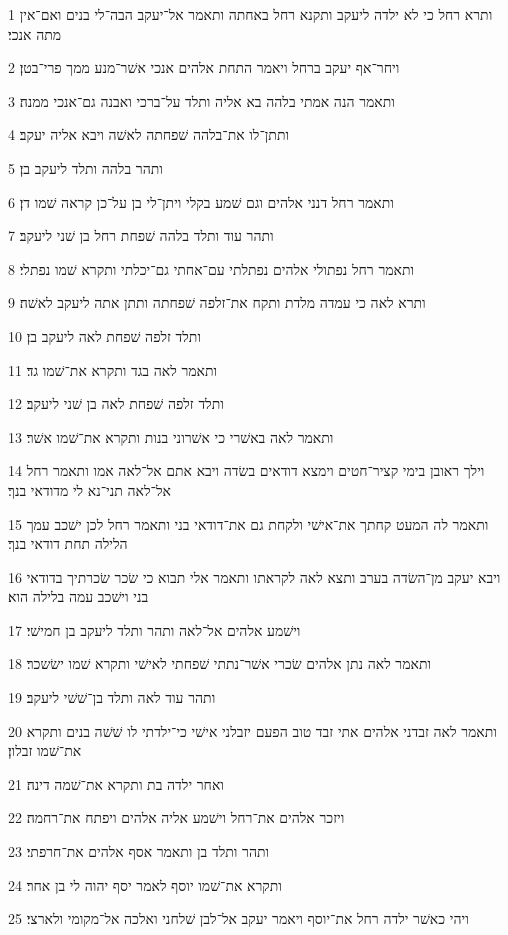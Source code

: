 \par 1 ותרא רחל כי לא ילדה ליעקב ותקנא רחל באחתה ותאמר אל־יעקב הבה־לי בנים ואם־אין מתה אנכי׃
\par 2 ויחר־אף יעקב ברחל ויאמר התחת אלהים אנכי אשׁר־מנע ממך פרי־בטן׃
\par 3 ותאמר הנה אמתי בלהה בא אליה ותלד על־ברכי ואבנה גם־אנכי ממנה׃
\par 4 ותתן־לו את־בלהה שׁפחתה לאשׁה ויבא אליה יעקב׃
\par 5 ותהר בלהה ותלד ליעקב בן׃
\par 6 ותאמר רחל דנני אלהים וגם שׁמע בקלי ויתן־לי בן על־כן קראה שׁמו דן׃
\par 7 ותהר עוד ותלד בלהה שׁפחת רחל בן שׁני ליעקב׃
\par 8 ותאמר רחל נפתולי אלהים נפתלתי עם־אחתי גם־יכלתי ותקרא שׁמו נפתלי׃
\par 9 ותרא לאה כי עמדה מלדת ותקח את־זלפה שׁפחתה ותתן אתה ליעקב לאשׁה׃
\par 10 ותלד זלפה שׁפחת לאה ליעקב בן׃
\par 11 ותאמר לאה בגד ותקרא את־שׁמו גד׃
\par 12 ותלד זלפה שׁפחת לאה בן שׁני ליעקב׃
\par 13 ותאמר לאה באשׁרי כי אשׁרוני בנות ותקרא את־שׁמו אשׁר׃
\par 14 וילך ראובן בימי קציר־חטים וימצא דודאים בשׂדה ויבא אתם אל־לאה אמו ותאמר רחל אל־לאה תני־נא לי מדודאי בנך׃
\par 15 ותאמר לה המעט קחתך את־אישׁי ולקחת גם את־דודאי בני ותאמר רחל לכן ישׁכב עמך הלילה תחת דודאי בנך׃
\par 16 ויבא יעקב מן־השׂדה בערב ותצא לאה לקראתו ותאמר אלי תבוא כי שׂכר שׂכרתיך בדודאי בני וישׁכב עמה בלילה הוא׃
\par 17 וישׁמע אלהים אל־לאה ותהר ותלד ליעקב בן חמישׁי׃
\par 18 ותאמר לאה נתן אלהים שׂכרי אשׁר־נתתי שׁפחתי לאישׁי ותקרא שׁמו ישׂשכר׃
\par 19 ותהר עוד לאה ותלד בן־שׁשׁי ליעקב׃
\par 20 ותאמר לאה זבדני אלהים אתי זבד טוב הפעם יזבלני אישׁי כי־ילדתי לו שׁשׁה בנים ותקרא את־שׁמו זבלון׃
\par 21 ואחר ילדה בת ותקרא את־שׁמה דינה׃
\par 22 ויזכר אלהים את־רחל וישׁמע אליה אלהים ויפתח את־רחמה׃
\par 23 ותהר ותלד בן ותאמר אסף אלהים את־חרפתי׃
\par 24 ותקרא את־שׁמו יוסף לאמר יסף יהוה לי בן אחר׃
\par 25 ויהי כאשׁר ילדה רחל את־יוסף ויאמר יעקב אל־לבן שׁלחני ואלכה אל־מקומי ולארצי׃
